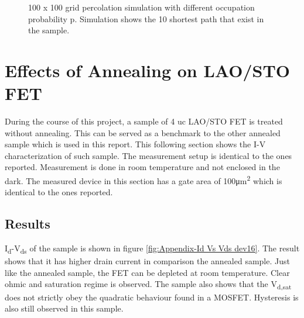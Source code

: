 \documentclass[11pt,a4paper]{report}
\begin{document}
\begin{figure}[!ht]
\hfil
\caption{100 x 100 grid percolation simulation with different occupation probability p. Simulation shows the 10 shortest path that exist in the sample.}
\label{fig:sample_visualized}
\end{figure}

\chapter{Effects of Annealing on LAO/STO FET}\label{section:annealing appendix}
During the course of this project, a sample of 4 uc LAO/STO FET is treated without annealing. This can be served as a benchmark to the other annealed sample which is used in this report. This following section shows the I-V characterization of such sample. The measurement setup is identical to the ones reported. Measurement is done in room temperature and not enclosed in the dark. The measured device in this section has a gate area of 100\si{\micro m^{2}} which is identical to the ones reported.

\section{Results}
I\textsubscript{d}-V\textsubscript{ds} of the sample is shown in figure \ref{fig:Appendix-Id Vs Vds dev16}. The result shows that it has higher drain current in comparison the annealed sample. Just like the annealed sample, the FET can be depleted at room temperature. Clear ohmic and saturation regime is observed. The sample also shows that the V\textsubscript{d,sat} does not strictly obey the quadratic behaviour found in a MOSFET. Hysteresis is also still observed in this sample.
\end{document}
